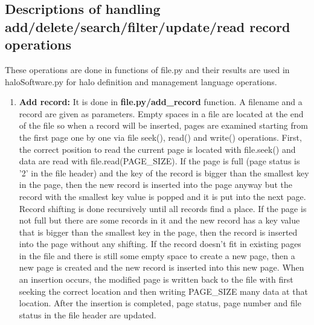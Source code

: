 \documentclass{article}
\begin{document}
\subsection{Descriptions of handling \\ add/delete/search/filter/update/read record operations}
These operations are done in functions of file.py and their results are used in haloSoftware.py for halo definition and management language operations.
\begin{enumerate}
    \item \textbf{Add record:} It is done in \textbf{file.py\slash add\_record} function. A filename and a record are given as parameters. Empty spaces in a file are located at the end of the file so when a record will be inserted, pages are examined starting from the first page one by one via file seek(), read() and write() operations. First, the correct position to read the current page is located with file.seek() and data are read with file.read(PAGE\_SIZE). If the page is full (page status is '2' in the file header) and the key of the record is bigger than the smallest key in the page, then the new record is inserted into the page anyway but the record with the smallest key value is popped and it is put into the next page. Record shifting is done recursively until all records find a place. If the page is not full but there are some records in it and the new record has a key value that is bigger than the smallest key in the page, then the record is inserted into the page without any shifting. If the record doesn't fit in existing pages in the file and there is still some empty space to create a new page, then a new page is created and the new record is inserted into this new page. When an insertion occurs, the modified page is written back to the file with first seeking the correct location and then writing PAGE\_SIZE many data at that location. After the insertion is completed, page status, page number and file status in the file header are updated. 

\end{enumerate}
\end{document}
